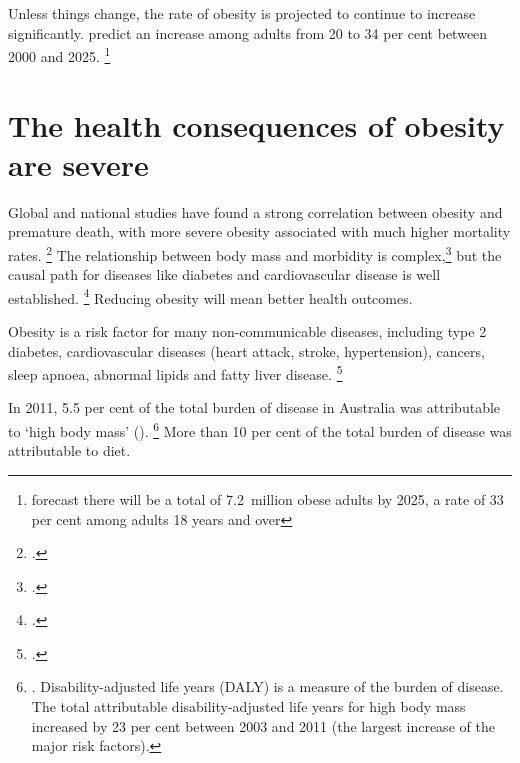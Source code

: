 \documentclass[embargoed]{grattan}
\begin{document}
Unless things change, the rate of obesity is projected to continue to increase significantly. \textcite{Walls2012Projectedprogressionprevalence} predict an increase among adults from 20 to 34 per cent between 2000 and 2025.%
\footnote{\textcite{PwC2015Weighingcostobesity} forecast there will be a total of 7.2~million obese adults by 2025, a rate of 33 per cent among adults 18 years and over}

\section{The health consequences of obesity are severe}\label{the-health-consequences-of-obesity-are-severe}

Global and national studies have found a strong correlation between obesity and premature death, with more severe obesity associated with much higher mortality rates.%
\footcites{Collaboration2016Bodymassindex}{Aune2016BMIallcause}{Flegal2013Associationallcause}{Korda2013Prospectivecohortstudy} The relationship between body mass and morbidity is complex,\footcites{Swinburn2004Dietnutritionprevention}{Livingston2012Progressobesityresearch} but the causal path for diseases like diabetes and cardiovascular disease is well established.%
\footcites{Poirier2006Obesitycardiovasculardisease}{Kritchevsky2015Intentionalweightloss}{Rueda-Clausen2015Healthbenefitslong}{Blackburn1995Effectdegreeweight} Reducing obesity will mean better health outcomes.



Obesity is a risk factor for many non-communicable diseases, including type 2 diabetes, cardiovascular diseases (heart attack, stroke, hypertension), cancers, sleep apnoea, abnormal lipids and fatty liver disease.%
\footcites[][39--40]{Organisation2000Dietnutritionprevention}{Must1999diseaseburdenassociated}{Collaboration2016Bodymassindex}{Nordstroem2016RisksMyocardialInfarction} 

In 2011, 5.5 per cent of the total burden of disease in Australia was attributable to `high body mass' ().%
\footnote{\textcite[][Table~6.1]{Health2016AustralianBurdenDisease}.
Disability-adjusted life years (DALY) is a measure of the burden of disease.
The total attributable disability-adjusted life years for high body mass increased by 23 per cent between 2003 and 2011 (the largest increase of the major risk factors).} More than 10 per cent of the total burden of disease was attributable to diet.
\end{document}

